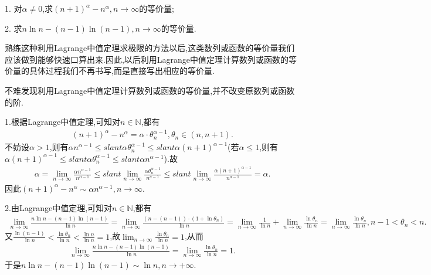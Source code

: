 \documentclass[../../main.tex]{subfiles}
\begin{document}
\begin{example}

1. 对\(\alpha \neq 0\),求\((n + 1)^{\alpha} - n^{\alpha}, n \to \infty\)的等价量;

2. 求\(n \ln n - (n - 1) \ln (n - 1), n \to \infty\)的等价量.
\end{example}
\begin{note}
熟练这种利用Lagrange中值定理求极限的方法以后,这类数列或函数的等价量我们应该做到能够快速口算出来.因此,以后利用Lagrange中值定理计算数列或函数的等价量的具体过程我们不再书写,而是直接写出相应的等价量.
\end{note}
\begin{remark}
不难发现利用Lagrange中值定理计算数列或函数的等价量,并不改变原数列或函数的阶.
\end{remark}
\begin{solution}
1.根据Lagrange中值定理,可知对$n\in\mathbb{N}$,都有
\begin{align*}
(n + 1)^{\alpha} - n^{\alpha}=\alpha\cdot\theta _{n}^{\alpha -1},\theta _{n}\in(n,n+1).
\end{align*}
不妨设$\alpha>1$,则有$\alpha n^{\alpha -1}\leqslant slant \alpha \theta _{n}^{\alpha -1}\leqslant slant \alpha \left( n+1 \right) ^{\alpha -1}$(若$\alpha\leqslant 1$,则有$\alpha \left( n+1 \right) ^{\alpha -1}\leqslant slant \alpha \theta _{n}^{\alpha -1}\leqslant slant \alpha n^{\alpha -1}$).故
\begin{align*}
\alpha =\lim_{n\rightarrow \infty} \frac{\alpha n^{\alpha -1}}{n^{\alpha -1}}\leqslant slant \lim_{n\rightarrow \infty} \frac{\alpha \theta _{n}^{\alpha -1}}{n^{a-1}}\leqslant slant \lim_{n\rightarrow \infty} \frac{\alpha (n+1)^{\alpha -1}}{n^{a-1}}=\alpha.
\end{align*}
因此$(n+1)^{\alpha}-n^{\alpha}\sim \alpha n^{\alpha -1},n\rightarrow \infty$.

2.由Lagrange中值定理,可知对$n\in\mathbb{N}$,都有
\begin{align*}
\lim_{n \to \infty} \frac{n \ln n - (n - 1) \ln (n - 1)}{\ln n} = \lim_{n \to \infty} \frac{(n - (n - 1)) \cdot (1 + \ln \theta_n)}{\ln n}= \lim_{n \to \infty} \frac{1}{\ln n} + \lim_{n \to \infty} \frac{\ln \theta_n}{\ln n}=\lim_{n \to \infty} \frac{\ln \theta_n}{\ln n}, n - 1 < \theta_n < n.
\end{align*}
又\(\frac{\ln (n - 1)}{\ln n} < \frac{\ln \theta_n}{\ln n} < \frac{\ln n}{\ln n} = 1\),故\(\lim_{n \to \infty} \frac{\ln \theta_n}{\ln n} = 1\),从而
\begin{align*}
\lim_{n \to \infty} \frac{n \ln n - (n - 1) \ln (n - 1)}{\ln n} = \lim_{n \to \infty} \frac{\ln \theta_n}{\ln n}=1.
\end{align*}
于是\(n \ln n - (n - 1) \ln (n - 1) \sim \ln n,n\to+\infty\).
\end{solution}
\end{document}
